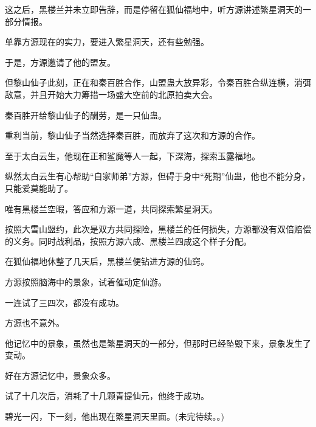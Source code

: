 \begin{this_body}
这之后，黑楼兰并未立即告辞，而是停留在狐仙福地中，听方源讲述繁星洞天的一部分情报。

单靠方源现在的实力，要进入繁星洞天，还有些勉强。

于是，方源邀请了他的盟友。

但黎山仙子此刻，正在和秦百胜合作，山盟蛊大放异彩，令秦百胜合纵连横，消弭敌意，并且开始大力筹措一场盛大空前的北原拍卖大会。

秦百胜开给黎山仙子的酬劳，是一只仙蛊。

重利当前，黎山仙子当然选择秦百胜，而放弃了这次和方源的合作。

至于太白云生，他现在正和鲨魔等人一起，下深海，探索玉露福地。

纵然太白云生有心帮助“自家师弟”方源，但碍于身中“死期”仙蛊，他也不能分身，只能爱莫能助了。

唯有黑楼兰空暇，答应和方源一道，共同探索繁星洞天。

按照大雪山盟约，此次是双方共同探险，黑楼兰的任何损失，方源都没有双倍赔偿的义务。同时战利品，按照方源六成、黑楼兰四成这个样子分配。

在狐仙福地休整了几天后，黑楼兰便钻进方源的仙窍。

方源按照脑海中的景象，试着催动定仙游。

一连试了三四次，都没有成功。

方源也不意外。

他记忆中的景象，虽然也是繁星洞天的一部分，但那时已经坠毁下来，景象发生了变动。

好在方源记忆中，景象众多。

试了十几次后，消耗了十几颗青提仙元，他终于成功。

碧光一闪，下一刻，他出现在繁星洞天里面。(未完待续。。)

\end{this_body}

